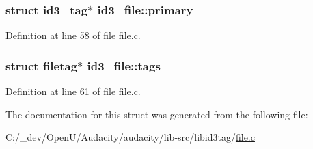 \subsubsection[{\texorpdfstring{primary}{primary}}]{\setlength{\rightskip}{0pt plus 5cm}struct {\bf id3\+\_\+tag}$\ast$ id3\+\_\+file\+::primary}\hypertarget{structid3__file_a51e2c5f377940144b340fc5fcf8d773d}{}\label{structid3__file_a51e2c5f377940144b340fc5fcf8d773d}


Definition at line 58 of file file.\+c.

\subsubsection[{\texorpdfstring{tags}{tags}}]{\setlength{\rightskip}{0pt plus 5cm}struct {\bf filetag}$\ast$ id3\+\_\+file\+::tags}\hypertarget{structid3__file_afb17612b7d876d4372c36475aa1d21bf}{}\label{structid3__file_afb17612b7d876d4372c36475aa1d21bf}


Definition at line 61 of file file.\+c.



The documentation for this struct was generated from the following file\+:\begin{DoxyCompactItemize}
\item 
C\+:/\+\_\+dev/\+Open\+U/\+Audacity/audacity/lib-\/src/libid3tag/\hyperlink{libid3tag_2file_8c}{file.\+c}\end{DoxyCompactItemize}
